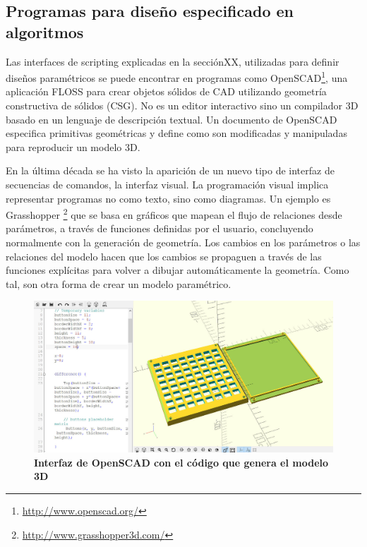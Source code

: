 \clearpage

\subsection{Programas para diseño especificado en algoritmos}
Las interfaces de scripting explicadas en la secciónXX, utilizadas para definir diseños paramétricos se puede encontrar en programas como OpenSCAD\footnote{\url{http://www.openscad.org/}}, una aplicación FLOSS para crear objetos sólidos de CAD utilizando geometría constructiva de sólidos (CSG). No es un editor interactivo sino un compilador 3D basado en un lenguaje de descripción textual. Un documento de OpenSCAD especifica primitivas geométricas y define como son modificadas y manipuladas para reproducir un modelo 3D.

En la última década se ha visto la aparición de un nuevo tipo de interfaz de secuencias de comandos, la interfaz visual. La programación visual implica representar programas no como texto, sino como diagramas. Un ejemplo es Grasshopper \footnote{ \url{http://www.grasshopper3d.com/}} que se basa en gráficos que mapean el flujo de relaciones desde parámetros, a través de funciones definidas por el usuario, concluyendo normalmente con la generación de geometría. Los cambios en los parámetros o las relaciones del modelo hacen que los cambios se propaguen a través de las funciones explícitas para volver a dibujar automáticamente la geometría. Como tal, son otra forma de crear un modelo paramétrico.


\begin{figure}[h]
\includegraphics[width=14cm]{Img/CPD/openscadc.jpg}
\centering
\caption{\textbf{\footnotesize{Interfaz de OpenSCAD con el código que genera el modelo 3D}}}
\end{figure}

